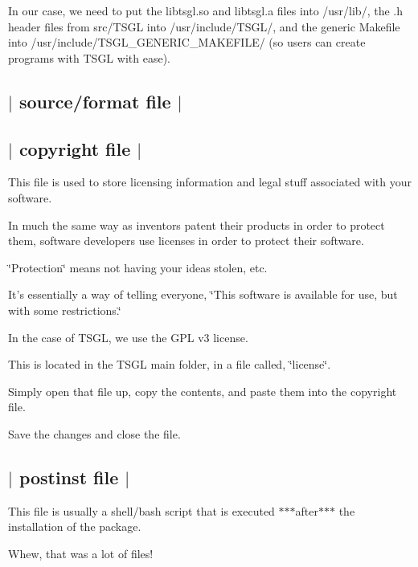 In our case, we need to put the {\ttfamily libtsgl.\-so} and {\ttfamily libtsgl.\-a} files into {\ttfamily /usr/lib/}, the {\ttfamily .h} header files from {\ttfamily src/\-T\-S\-G\-L} into {\ttfamily /usr/include/\-T\-S\-G\-L/}, and the generic {\ttfamily Makefile} into {\ttfamily /usr/include/\-T\-S\-G\-L\-\_\-\-G\-E\-N\-E\-R\-I\-C\-\_\-\-M\-A\-K\-E\-F\-I\-L\-E/} (so users can create programs with T\-S\-G\-L with ease).



 \subsection*{$\vert$ {\ttfamily source/format} file $\vert$ }



 \subsection*{$\vert$ {\ttfamily copyright} file $\vert$ }

This file is used to store licensing information and legal stuff associated with your software.

In much the same way as inventors patent their products in order to protect them, software developers use licenses in order to protect their software.

\char`\"{}\-Protection\char`\"{} means not having your ideas stolen, etc.

It's essentially a way of telling everyone, \char`\"{}\-This software is available for use, but with some restrictions.\char`\"{}

In the case of T\-S\-G\-L, we use the G\-P\-L v3 license.

This is located in the T\-S\-G\-L main folder, in a file called, \char`\"{}license\char`\"{}.

Simply open that file up, copy the contents, and paste them into the {\ttfamily copyright} file.

Save the changes and close the file. 

 \subsection*{$\vert$ {\ttfamily postinst} file $\vert$ }

This file is usually a shell/bash script that is executed $\ast$$\ast$$\ast$after$\ast$$\ast$$\ast$ the installation of the package.

Whew, that was a lot of files!

